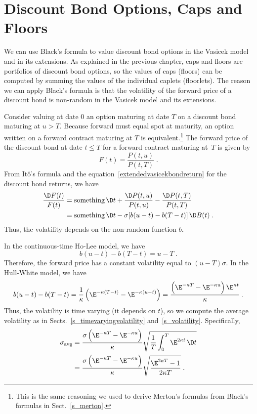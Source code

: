 \section{Discount Bond Options, Caps and Floors}\label{s_vasicek_discounts}

We can use Black's formula to value discount bond options  in the Vasicek model and in its extensions.  As explained in the previous chapter, caps and floors are portfolios of discount bond options, so the values of caps (floors) can be computed by summing the  values of the individual caplets (floorlets).
The reason we can apply Black's formula is that the volatility of the forward price of a discount bond is non-random in the Vasicek model and its extensions.  

Consider valuing at date 0 an option maturing at date $T$ on a discount bond maturing at $u>T$.  Because forward must equal spot at maturity, an option written on a forward contract maturing at $T$ is equivalent.\footnote{This is the same reasoning we used to derive Merton's formulas from Black's formulas in Sect.~\ref{s_merton}.} The forward price of the discount bond at date $t \leq T$ for a forward contract maturing at~$T$ is given by
$$F(t) =\frac{P(t,u)}{P(t,T)}\; .$$
From It\^o's formula and the equation~\eqref{extendedvasicekbondreturn} for the discount bond returns, we have
\begin{align*}
\frac{\D F(t)}{F(t)} &= \text{something}\,\D t + \frac{\D P(t,u)}{P(t,u)} - \frac{\D P(t,T)}{P(t,T)}\\
&= \text{something}\,\D t -\sigma[b(u-t)-b(T-t)]\,\D B(t)\;.
\end{align*}
Thus, the volatility depends on the non-random function $b$.

In the continuous-time Ho-Lee model, we have
$$b(u-t)-b(T-t) = u-T\; .$$
Therefore, the forward price has a constant volatility equal to $(u-T)\sigma$.  In the Hull-White model, we have
$$b(u-t)-b(T-t) = \frac{1}{\kappa}\left(\E^{-\kappa(T-t)}-\E^{-\kappa(u-t)}\right) = \frac{\left(\E^{-\kappa T} - \E^{-\kappa u}\right)\E^{\kappa t}}{\kappa} \; .$$
Thus, the volatility is time varying (it depends on $t$), so we compute the average 
volatility as in Sects.~\ref{s_timevaryingvolatility} and~\ref{s_volatility}.  Specifically,
\begin{align}
\sigma_{\text{avg}} &= \frac{\sigma\left(\E^{-\kappa T} - \E^{-\kappa u}\right)}{\kappa} \sqrt{\frac{1}{T}\int_0^T \E^{2\kappa t}\,\D t}\notag\\
&=\frac{\sigma\left(\E^{-\kappa T} - \E^{-\kappa u}\right)}{\kappa}\sqrt{\frac{\E^{2\kappa T}-1}{2\kappa T}}\;.\label{vasiceksigmaavg}
\end{align}

